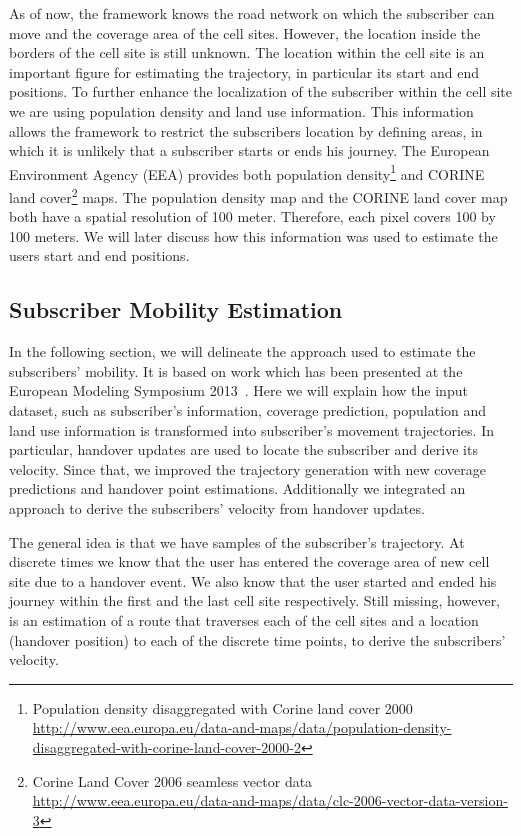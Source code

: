 \documentclass[twocolumn]{bmcart}%
\begin{document}
As of now, the framework knows the road network on which the subscriber can move and the coverage area of the cell sites. However, the location inside the borders of the cell site is still unknown. The location within the cell site is an important figure for estimating the trajectory, in particular its start and end positions. To further enhance the localization of the subscriber within the cell site we are using population density and land use information. This information allows the framework to restrict the subscribers location by defining areas, in which it is unlikely that a subscriber starts or ends his journey. The European Environment Agency (EEA) provides both population density\footnote{Population density disaggregated with Corine land cover 2000 \url{http://www.eea.europa.eu/data-and-maps/data/population-density-disaggregated-with-corine-land-cover-2000-2}} and CORINE land cover\footnote{Corine Land Cover 2006 seamless vector data \url{http://www.eea.europa.eu/data-and-maps/data/clc-2006-vector-data-version-3}} maps. The population density map and the CORINE land cover map both have a spatial resolution of 100 meter. Therefore, each pixel covers 100 by 100 meters. We will later discuss how this information was used to estimate the users start and end positions.

\subsection*{Subscriber Mobility Estimation}
In the following section, we will delineate the approach used to estimate the subscribers' mobility. It is based on work which has been presented at the European Modeling Symposium 2013~\cite{Kieslich2013}. Here we will explain how the input dataset, such as subscriber's information, coverage prediction, population and land use information is transformed into subscriber's movement trajectories. In particular, handover updates are used to locate the subscriber and derive its velocity. Since that, we improved the trajectory generation with new coverage predictions and handover point estimations. Additionally we integrated an approach to derive the subscribers’ velocity from handover updates.

The general idea is that we have samples of the subscriber's trajectory. At discrete times we know that the user has entered the coverage area of new cell site due to a handover event. We also know that the user started and ended his journey within the first and the last cell site respectively. Still missing, however, is an estimation of a route that traverses each of the cell sites and a location (handover position) to each of the discrete time points, to derive the subscribers’ velocity.
\end{document}
